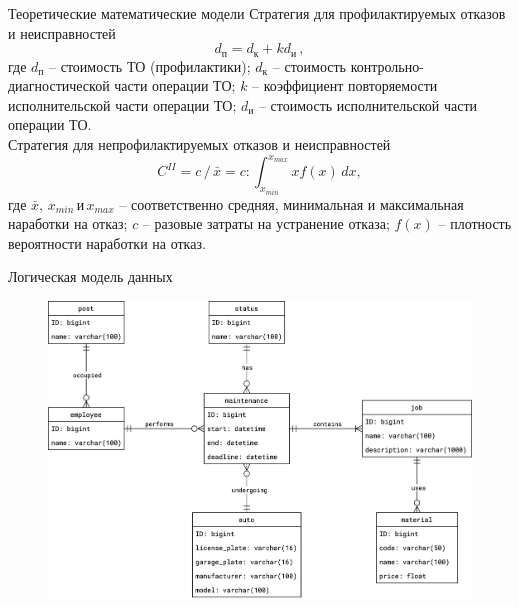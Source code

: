 \documentclass{beamer}
\begin{document}
\begin{frame}
	{Теоретические математические модели}
    Стратегия для профилактируемых отказов и неисправностей
    \begin{equation*}
        d_{\text{п}} = d_{\text{к}} + k d_{\text{и}}\,,
    \end{equation*}
    {\footnotesize
        где $d_{\text{п}}$ -- стоимость ТО (профилактики); $d_{\text{к}}$ --
        стоимость контрольно-диагностической части операции ТО; $k$ --
        коэффициент повторяемости исполнительской части операции ТО;
        $d_{\text{и}}$ -- стоимость исполнительской части операции ТО.
    }
    \\[\baselineskip]
    Стратегия для непрофилактируемых отказов и неисправностей
    \begin{equation*}
        C^{II} =
        c\,/\,\bar{x} =
        c : \int_{x_{min}}^{x_{max}} x f(x)\,dx,
    \end{equation*}
    {\footnotesize
        где $\bar{x},\,x_{min} \,\text{и} \,x_{max}$ -- соответственно средняя,
        минимальная и максимальная наработки на отказ; $c$ -- разовые затраты на
        устранение отказа; $f(x)$ -- плотность вероятности наработки на отказ.
    }
\end{frame}

\begin{frame}
	{Логическая модель данных}
    \begin{figure}[H]
        \centering
        \includegraphics[keepaspectratio,width=\textwidth]{3/images/3_1_db_logical.png}
    \end{figure}
\end{frame}
\end{document}
